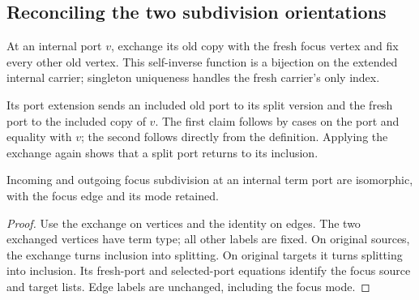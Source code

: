 \subsection{Reconciling the two subdivision orientations}
\begin{definition}\label{term:subdivision-exchange}
At an internal port $v$, exchange its old copy with the fresh focus vertex and
fix every other old vertex. This self-inverse function is a bijection on the
extended internal carrier; singleton uniqueness handles the fresh carrier's
only index.
\end{definition}
Its port extension sends an included old port to its split version and the
fresh port to the included copy of $v$. The first claim follows by cases on
the port and equality with $v$; the second follows directly from the definition.
Applying the exchange again shows that a split port returns to its inclusion.
\begin{theorem}
Incoming and outgoing focus subdivision at an internal term port are
isomorphic, with the focus edge and its mode retained.
\end{theorem}
\begin{proof}
Use the exchange on vertices and the identity on edges. The two exchanged
vertices have term type; all other labels are fixed. On original sources,
the exchange turns inclusion into splitting. On original targets it turns
splitting into inclusion. Its fresh-port and selected-port equations identify
the focus source and target lists. Edge labels are unchanged, including the
focus mode.
\end{proof}

